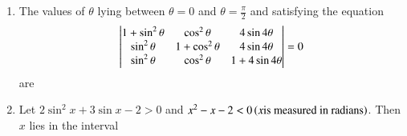 \documentclass[journal,12pt,twocolumn,article]{IEEEtran}
\theoremstyle{remark}
\begin{document}
\begin{enumerate}
\hfill{}
\begin{enumerate}
\end{enumerate}
\item The values of $\theta$ lying between $\theta = 0$ and $\theta = \frac{\pi}{2}$ and satisfying the equation
\[\begin{vmatrix}
$$1+\sin^2\theta$$ & $$\cos^2\theta$$ & $$4\sin4\theta$$\\
$$\sin^2\theta$$ & $$1+\cos^2\theta$$ & $$4\sin4\theta$$\\
$$\sin^2\theta$$ & $$\cos^2\theta$$ & $$1+4\sin4\theta$$
\end{vmatrix} = 0\] are
\hfill{}
\begin{enumerate}
\end{enumerate}
\item Let $2\sin^2x+3\sin x-2>0$ and $x^2-x-2<0 \left(x \text{is measured in radians}\right)$. Then $x$ lies in the interval
\hfill{}
\begin{enumerate}
\end{enumerate}
\end{enumerate}
\end{document}
